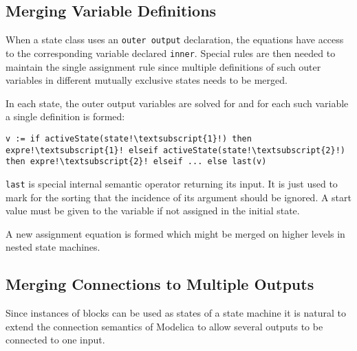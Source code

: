 \subsection{Merging Variable Definitions}\label{merging-variable-definitions}

\begin{nonnormative}
When a state class uses an \lstinline!outer output! declaration,
the equations have access to the corresponding variable declared
\lstinline!inner!. Special rules are then needed to maintain the single
assignment rule since multiple definitions of such outer variables in
different mutually exclusive states needs to be merged.
\end{nonnormative}

In each state, the outer output variables are solved for and for each
such variable a single definition is formed:
\begin{lstlisting}[language=modelica,escapechar=!]
v := if activeState(state!\textsubscript{1}!) then expre!\textsubscript{1}! elseif activeState(state!\textsubscript{2}!) then expre!\textsubscript{2}! elseif ... else last(v)
\end{lstlisting}

\lstinline!last! is special internal semantic operator returning its
input. It is just used to mark for the sorting that the incidence of its
argument should be ignored. A start value must be given to the variable
if not assigned in the initial state.

A new assignment equation is formed which might be merged on higher
levels in nested state machines.

\subsection{Merging Connections to Multiple Outputs}\label{merging-connections-to-multiple-outputs}

\begin{nonnormative}
Since instances of blocks can be used as states of a state
machine it is natural to extend the connection semantics of Modelica to
allow several outputs to be connected to one input.
\end{nonnormative}

